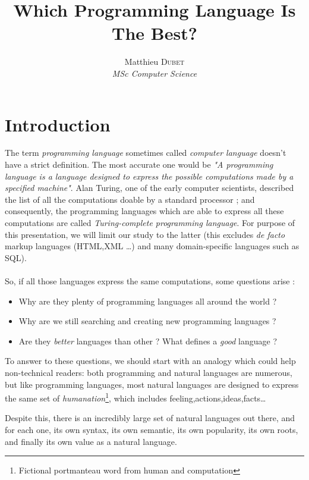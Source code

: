 \documentclass[a4paper]{article}
\title{Which Programming Language Is The Best?}
\author{
Matthieu \textsc{Dubet} \\
\emph{MSc Computer Science}
}
\begin{document}
\maketitle
\clearpage
\tableofcontents
\clearpage
\section{Introduction}
The term \emph{programming language} sometimes called \emph{computer language} doesn't have a strict definition. The most accurate one would be \emph{"A programming language is a language designed to express the possible computations made by a specified machine"}.\cite{wiki:definition} Alan Turing, one of the early computer scientists, described the list of all the computations doable by a standard processor ; and consequently, the programming languages which are able to express all these computations are called \emph{Turing-complete programming language}. For purpose of this presentation, we will limit our study to the latter (this excludes \emph{de facto} markup languages (\textsc{HTML},\textsc{XML} \ldots) and many domain-specific languages such as \textsc{SQL}).

\paragraph{}

So, if all those languages express the same computations, some questions arise :
\begin{itemize}
\item
Why are they plenty of programming languages all around the world ?
\item
Why are we still searching and creating new programming languages ?
\item
Are they \emph{better} languages than other ? What defines a \emph{good} language ?
\end{itemize}

To answer to these questions, we should start with an analogy which could help non-technical readers: both programming and natural languages are numerous, but like programming languages, most natural languages are designed to express the same set of \emph{humanation}\footnote{Fictional portmanteau word from human and computation}, which includes feeling,actions,ideas,facts\ldots

Despite this, there is an incredibly large set of natural languages out there, and for each one, its own syntax, its own semantic, its own popularity, its own roots, and finally its own value as a natural language.
\end{document}
